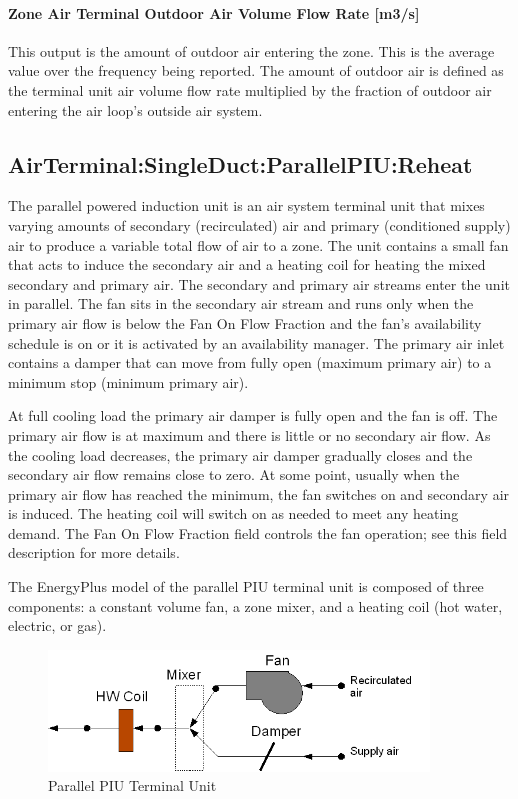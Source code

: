 \paragraph{Zone Air Terminal Outdoor Air Volume Flow Rate {[}m3/s{]}}

This output is the amount of outdoor air entering the zone. This is the average value over the frequency being reported. The amount of outdoor air is defined as the terminal unit air volume flow rate multiplied by the fraction of outdoor air entering the air loop's outside air system.

\subsection{AirTerminal:SingleDuct:ParallelPIU:Reheat}\label{airterminalsingleductparallelpiureheat}

The parallel powered induction unit is an air system terminal unit that mixes varying amounts of secondary (recirculated) air and primary (conditioned supply) air to produce a variable total flow of air to a zone. The unit contains a small fan that acts to induce the secondary air and a heating coil for heating the mixed secondary and primary air. The secondary and primary air streams enter the unit in parallel. The fan sits in the secondary air stream and runs only when the primary air flow is below the Fan On Flow Fraction and the fan's availability schedule is on or it is activated by an availability manager. The primary air inlet contains a damper that can move from fully open (maximum primary air) to a minimum stop (minimum primary air).

At full cooling load the primary air damper is fully open and the fan is off. The primary air flow is at maximum and there is little or no secondary air flow. As the cooling load decreases, the primary air damper gradually closes and the secondary air flow remains close to zero. At some point, usually when the primary air flow has reached the minimum, the fan switches on and secondary air is induced. The heating coil will switch on as needed to meet any heating demand. The Fan On Flow Fraction field controls the fan operation; see this field description for more details.

The EnergyPlus model of the parallel PIU terminal unit is composed of three components: a constant volume fan, a zone mixer, and a heating coil (hot water, electric, or gas).

\begin{figure}[hbtp] %
\centering
\includegraphics[width=0.9\textwidth, height=0.9\textheight, keepaspectratio=true]{media/image271.png}
\caption{Parallel PIU Terminal Unit \protect \label{fig:parallel-piu-terminal-unit}}
\end{figure}

